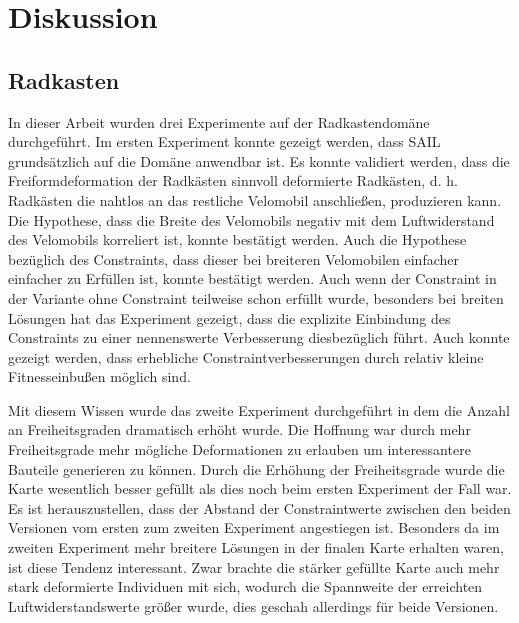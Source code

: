 \section{Diskussion}

\subsection{Radkasten}

In dieser Arbeit wurden drei Experimente auf der Radkastendomäne durchgeführt.
Im ersten Experiment konnte gezeigt werden, dass SAIL grundsätzlich auf die Domäne anwendbar ist.
Es konnte validiert werden, dass die Freiformdeformation der Radkästen sinnvoll deformierte Radkästen, d. h. Radkästen die nahtlos an das restliche Velomobil anschließen, produzieren kann.
Die Hypothese, dass die Breite des Velomobils negativ mit dem Luftwiderstand des Velomobils korreliert ist, konnte bestätigt werden.
Auch die Hypothese bezüglich des Constraints, dass dieser bei breiteren Velomobilen einfacher einfacher zu Erfüllen ist, konnte bestätigt werden.
Auch wenn der Constraint in der Variante ohne Constraint teilweise schon erfüllt wurde, besonders bei breiten Lösungen hat das Experiment gezeigt, dass die explizite Einbindung des Constraints zu einer nennenswerte Verbesserung diesbezüglich führt.
Auch konnte gezeigt werden, dass erhebliche Constraintverbesserungen durch relativ kleine Fitnesseinbußen möglich sind.

Mit diesem Wissen wurde das zweite Experiment durchgeführt in dem die Anzahl an Freiheitsgraden dramatisch erhöht wurde.
Die Hoffnung war durch mehr Freiheitsgrade mehr mögliche Deformationen zu erlauben um interessantere Bauteile generieren zu können.
Durch die Erhöhung der Freiheitsgrade wurde die Karte wesentlich besser gefüllt als dies noch beim ersten Experiment der Fall war.
Es ist herauszustellen, dass der Abstand der Constraintwerte zwischen den beiden Versionen vom ersten zum zweiten Experiment angestiegen ist.
Besonders da im zweiten Experiment mehr breitere Lösungen in der finalen Karte erhalten waren, ist diese Tendenz interessant.
Zwar brachte die stärker gefüllte Karte auch mehr stark deformierte Individuen mit sich, wodurch die Spannweite der erreichten Luftwiderstandswerte größer wurde, dies geschah allerdings für beide Versionen.

